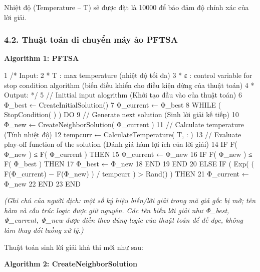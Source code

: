 \documentclass[
  vietnamese,
]{article}
\newenvironment{Shaded}{}{}
\newcommand{\NormalTok}[1]{#1}
\begin{document}
Nhiệt độ (Temperature -- T) sẽ được đặt là 10000 để bảo đảm độ chính xác
của lời giải.

\subsubsection{4.2. Thuật toán di chuyển máy ảo
PFTSA}\label{thuux1eadt-touxe1n-di-chuyux1ec3n-muxe1y-ux1ea3o-pftsa}

\textbf{Algorithm 1: PFTSA}

\begin{Shaded}
\begin{Highlighting}[]
\NormalTok{1   /* Input:}
\NormalTok{2    *  T           : max temperature (nhiệt độ tối đa)}
\NormalTok{3    *  ε           : control variable for stop condition algorithm}
\NormalTok{                       (biến điều khiển cho điều kiện dừng của thuật toán)}
\NormalTok{4    *  Output:                          */}
\NormalTok{5   // Inittial input alogrithm (Khởi tạo đầu vào của thuật toán)}
\NormalTok{6   Φ\_best ← CreateInitialSolution()}
\NormalTok{7   Φ\_current ← Φ\_best}
\NormalTok{8   WHILE ( StopCondition( ) ) DO}
\NormalTok{9       // Generate next solution (Sinh lời giải kế tiếp)}
\NormalTok{10          Φ\_new ← CreateNeighborSolution( Φ\_current )}
\NormalTok{11      // Calculate temperature (Tính nhiệt độ)}
\NormalTok{12          tempcurr ← CalculateTemperature( T, : )}
\NormalTok{13      // Evaluate play{-}off function of the solution}
\NormalTok{             (Đánh giá hàm lợi ích của lời giải)}
\NormalTok{14      IF F( Φ\_new ) ≤ F( Φ\_current ) THEN}
\NormalTok{15              Φ\_current ← Φ\_new}
\NormalTok{16          IF F( Φ\_new ) ≤ F( Φ\_best ) THEN}
\NormalTok{17                  Φ\_best ← Φ\_new}
\NormalTok{18          END}
\NormalTok{19      END}
\NormalTok{20      ELSE IF ( Exp( ( F(Φ\_current) − F(Φ\_new) ) / tempcurr ) \textgreater{} Rand() ) THEN}
\NormalTok{21              Φ\_current ← Φ\_new}
\NormalTok{22      END}
\NormalTok{23  END}
\end{Highlighting}
\end{Shaded}

\emph{(Ghi chú của người dịch: một số ký hiệu biến/lời giải trong mã giả
gốc bị mờ; tên hàm và cấu trúc logic được giữ nguyên. Các tên biến lời
giải như Φ\_best, Φ\_current, Φ\_new được điền theo đúng logic của thuật
toán để dễ đọc, không làm thay đổi luồng xử lý.)}

Thuật toán sinh lời giải khả thi mới như sau:

\textbf{Algorithm 2: CreateNeighborSolution}
\end{document}
